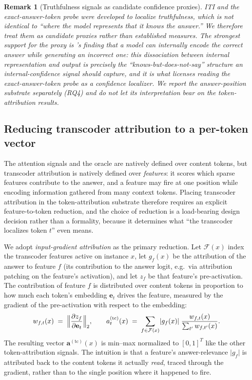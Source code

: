 \documentclass[11pt]{article}
\newtheorem{remark}{Remark}
\begin{document}
\begin{remark}[Truthfulness signals as candidate confidence proxies]
\label{rem:confidence}
ITI \citep{li2023iti} and the exact-answer-token probe \citep{orgad2024}
were developed to localize truthfulness, which is not identical to ``where
the model represents that it knows the answer.'' We therefore treat them as
candidate proxies rather than established measures. The strongest support for
the proxy is \citet{orgad2024}'s finding that a model can internally encode
the correct answer while generating an incorrect one: this dissociation
between internal representation and output is precisely the
``knows-but-does-not-say'' structure an internal-confidence signal should
capture, and it is what licenses reading the exact-answer-token probe as a
confidence localizer. We report the answer-position substrate separately
(RQ4) and do not let its interpretation bear on the token-attribution
results.
\end{remark}

\subsection{Reducing transcoder attribution to a per-token vector}
\label{sec:formalization-reduction}

The attention signals and the oracle are natively defined over content
tokens, but transcoder attribution is natively defined over \emph{features}:
it scores which sparse features contribute to the answer, and a feature may
fire at one position while encoding information gathered from many context
tokens. Placing transcoder attribution in the token-attribution substrate
therefore requires an explicit feature-to-token reduction, and the choice of
reduction is a load-bearing design decision rather than a formality, because
it determines what ``the transcoder localizes token $t$'' even means.

We adopt \emph{input-gradient attribution} as the primary reduction.
Let $\mathcal{F}(x)$ index the transcoder features active on instance $x$,
let $g_f(x)$ be the attribution of the answer to feature $f$ (its
contribution to the answer logit, e.g.\ via attribution patching on the
feature's activation), and let $z_f$ be that feature's pre-activation. The
contribution of feature $f$ is distributed over content tokens in proportion
to how much each token's embedding $\mathbf{e}_t$ drives the feature, measured
by the gradient of the pre-activation with respect to the embedding:
\[
  w_{f,t}(x)
  \;=\;
  \Bigl\lVert \frac{\partial z_f}{\partial \mathbf{e}_t} \Bigr\rVert_2 ,
  \qquad
  a^{(\mathrm{tc})}_t(x)
  \;=\;
  \sum_{f \in \mathcal{F}(x)}
  \lvert g_f(x) \rvert \;
  \frac{w_{f,t}(x)}{\sum_{t'} w_{f,t'}(x)} .
\]
The resulting vector $\mathbf{a}^{(\mathrm{tc})}(x)$ is min--max normalized to
$[0,1]^T$ like the other token-attribution signals. The intuition is that a
feature's answer-relevance $\lvert g_f \rvert$ is attributed back to the
content tokens it actually \emph{read}, traced through the gradient, rather
than to the single position where it happened to fire.
\end{document}
